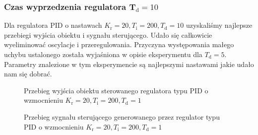 \subsubsection{Czas wyprzedzenia regulatora $\mathbf{T_{\mathrm{d}}}=\num{10}$}
Dla regulatora PID o nastawach $K_{\mathrm{r}} = \num{20}, T_{\mathrm{i}} = 200, T_{\mathrm{d}} = 10$ uzyskaliśmy najlepsze przebiegi wyjścia obiektu i sygnału sterującego. Udało się całkowicie wyeliminować oscylacje i przeregulowania. Przyczyna występowania małego uchybu ustalonego została wyjaśniona w opisie eksperymentu dla $ T_{\mathrm{d}} = 5$. Parametry znalezione w tym eksperymencie są najlepszymi nastawami jakie udało nam się dobrać. 

\begin{figure}[t]
    \centering
    \caption{Przebieg wyjścia obiektu sterowanego regulatora typu PID o wzmocnieniu $K_{\mathrm{r}} = \num{20}, T_{\mathrm{i}} = 200, T_{\mathrm{d}} = 1$}
    \label{zad5_niegasnace_oscylacje_20_200_1}
\end{figure}

\begin{figure}[b]
    \centering
    \caption{Przebieg sygnału sterującego generowanego przez regulator typu PID o wzmocnieniu $K_{\mathrm{r}} = \num{20}, T_{\mathrm{i}} = 200, T_{\mathrm{d}} = 1$}
    \label{zad5_niegasnace_oscylacje_ster_20_200_1}
\end{figure}
\FloatBarrier

